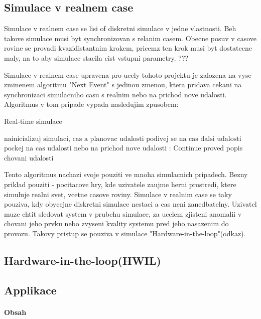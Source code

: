 \subsection*{Simulace v realnem case}
Simulace v realnem case se lisi of diskretni simulace v jedne vlastnosti. Beh takove simulace musi byt synchronizovan s relanim casem. Obecne posuv v casove rovine se provadi kvazidistantnim krokem, pricemz ten krok musi byt dostatecne maly, na to aby simulace stacila cist vstupni parametry. ??? %

Simulace v realnem case upravena pro ucely tohoto projektu je zalozena na vyse zminenem algoritmu "Next Event" s jedinou zmenou, ktera pridava cekani na synchronizaci simulacniho casu s realnim nebo na prichod nove udalosti. Algoritmus v tom pripade vypada nasledujim zpusobem:

\begin{algorithm}
\caption{Real-time simulace}\label{euclid}
\begin{algorithmic}[1]
\State $\text{nainicializuj simulaci, cas a planovac udalosti}$
\State $\text{podivej se na cas dalsi udalosti}$
\Return
\EndIf
\State $\text{pockej na cas udalosti nebo na prichod nove udalosti}$
:
    \State Continue
\EndIf
\State proved popis chovani udalosti
\EndWhile
\end{algorithmic}
\end{algorithm}

Tento algoritmus nachazi svoje pouziti ve mnoha simulacnich pripadech. Bezny priklad pouziti - pocitacove hry, kde uzivatele zaujme herni prostredi, ktere simuluje realni svet, vcetne casove roviny. Simulace v realnim case se taky pouziva, kdy obycejne diskretni simulace nestaci a cas neni zanedbatelny. Uzivatel muze chtit sledovat system v prubehu simulace, za ucelem zjisteni anomalii v chovani jeho prvku nebo zvyseni kvality systemu pred jeho nasazenim do provozu. Takovy pristup se pouziva v simulace "Hardware-in-the-loop"(odkaz).
\subsection*{Hardware-in-the-loop(HWIL)}
\subsection*{Applikace}
\paragraph*{Obsah}

